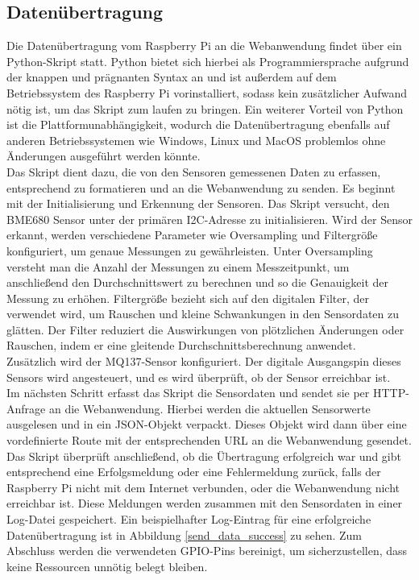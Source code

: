 \documentclass[conference]{IEEEtran}
\begin{document}
\subsection{Datenübertragung}
\label{chapter:datenuebertragung}
Die Datenübertragung vom Raspberry Pi an die Webanwendung findet über ein Python-Skript statt. Python bietet sich hierbei als Programmiersprache aufgrund der knappen und prägnanten Syntax an und ist außerdem auf dem Betriebssystem des Raspberry Pi vorinstalliert, sodass kein zusätzlicher Aufwand nötig ist, um das Skript zum laufen zu bringen. Ein weiterer Vorteil von Python ist die Plattformunabhängigkeit, wodurch die Datenübertragung ebenfalls auf anderen Betriebssystemen wie Windows, Linux und MacOS problemlos ohne Änderungen ausgeführt werden könnte. \\
Das Skript dient dazu, die von den Sensoren gemessenen Daten zu erfassen, entsprechend zu formatieren und an die Webanwendung zu senden. Es beginnt mit der Initialisierung und Erkennung der Sensoren. Das Skript versucht, den BME680 Sensor unter der primären I2C-Adresse zu initialisieren. Wird der Sensor erkannt, werden verschiedene Parameter wie Oversampling und Filtergröße konfiguriert, um genaue Messungen zu gewährleisten. Unter Oversampling versteht man die Anzahl der Messungen zu einem Messzeitpunkt, um anschließend den Durchschnittswert zu berechnen und so die Genauigkeit der Messung zu erhöhen. Filtergröße bezieht sich auf den digitalen Filter, der verwendet wird, um Rauschen und kleine Schwankungen in den Sensordaten zu glätten. Der Filter reduziert die Auswirkungen von plötzlichen Änderungen oder Rauschen, indem er eine gleitende Durchschnittsberechnung anwendet. \\
Zusätzlich wird der MQ137-Sensor konfiguriert. Der digitale Ausgangspin dieses Sensors wird angesteuert, und es wird überprüft, ob der Sensor erreichbar ist. \\
Im nächsten Schritt erfasst das Skript die Sensordaten und sendet sie per HTTP-Anfrage an die Webanwendung. Hierbei werden die aktuellen Sensorwerte ausgelesen und in ein JSON-Objekt verpackt. Dieses Objekt wird dann über eine vordefinierte Route mit der entsprechenden URL an die Webanwendung gesendet. Das Skript überprüft anschließend, ob die Übertragung erfolgreich war und gibt entsprechend eine Erfolgsmeldung oder eine Fehlermeldung zurück, falls der Raspberry Pi nicht mit dem Internet verbunden, oder die Webanwendung nicht erreichbar ist. Diese Meldungen werden zusammen mit den Sensordaten in einer Log-Datei gespeichert. Ein beispielhafter Log-Eintrag für eine erfolgreiche Datenübertragung ist in Abbildung \ref{send_data_success} zu sehen. Zum Abschluss werden die verwendeten GPIO-Pins bereinigt, um sicherzustellen, dass keine Ressourcen unnötig belegt bleiben.
\end{document}
